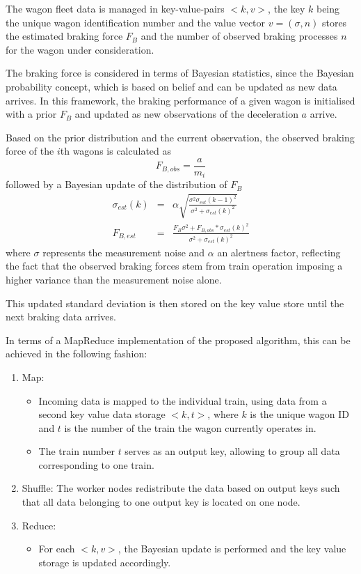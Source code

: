 \documentclass[a4paper, 12pt]{scrartcl}
\begin{document}
The wagon fleet data is managed in key-value-pairs $<k, v>$, the key $k$ being the unique wagon identification number and the value vector $v = \left(\sigma, n\right)$ stores the estimated braking force $F_{B}$ and the number of observed braking processes $n$ for the wagon under consideration.

The braking force is considered in terms of Bayesian statistics, since the Bayesian probability concept, which is based on belief and can be updated as new data arrives. In this framework, the braking performance of a given wagon is initialised with a prior $F_{B}$ and updated as new observations of the deceleration $a$ arrive.

Based on the prior distribution and the current observation, the observed braking force of the $i$th wagons is calculated as 
\begin{equation}
F_{B, obs} =\frac{a}{m_{i}}
\end{equation}
followed by a Bayesian update of the distribution of $F_{B}$
\begin{eqnarray}
\sigma_{est}(k) &=& \alpha \sqrt{\frac{\sigma^2 \sigma_{est}(k-1)^2}{\sigma^2+\sigma_{est}(k)^2}}\\
F_{B,est} &=& \frac{F_{B} \sigma^2 + F_{B, obs}*\sigma_{est}(k)^2}{\sigma^2+\sigma_{est}(k)^2} 
\end{eqnarray}
where $\sigma$ represents the measurement noise and $\alpha$ an alertness factor, reflecting the fact that the observed braking forces stem from train operation imposing a higher variance than the measurement noise alone.

This updated standard deviation is then stored on the key value store until the next braking data arrives.

In terms of a MapReduce implementation of the proposed algorithm, this can be achieved in the following fashion:
\begin{enumerate}
	\item Map: 
	\begin{itemize}
		\item Incoming data is mapped to the individual train, using data from a second key value data storage $<k, t>$, where $k$ is the unique wagon ID and $t$ is the number of the train the wagon currently operates in.
		\item The train number $t$ serves as an output key, allowing to group all data corresponding to one train.
		\end{itemize}
	\item Shuffle: The worker nodes redistribute the data based on output keys such that all data belonging to one output key is located on one node.
	\item Reduce: 
	\begin{itemize}
		\item For each $<k, v>$, the Bayesian update is performed and the key value storage is updated accordingly.
		\end{itemize}
\end{enumerate}
\end{document}
